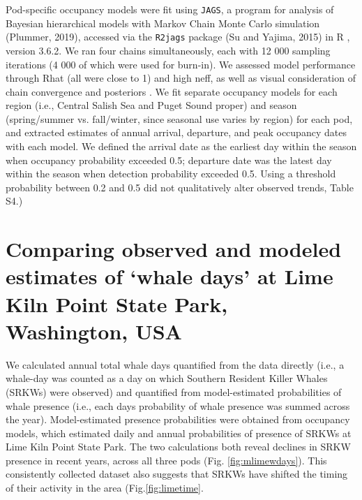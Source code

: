 \documentclass{article}
\begin{document}
\begin{enumerate}
\par Pod-specific occupancy models were fit using \texttt{JAGS}, a program for analysis of Bayesian hierarchical models with Markov Chain Monte Carlo simulation (Plummer, 2019), accessed via the \texttt{R2jags} package (Su and Yajima, 2015) in R \citep{Rcore2019}, version 3.6.2. We ran four chains simultaneously, each with 12 000 sampling iterations (4 000 of which were used for burn-in). We assessed model performance through Rhat (all were close to 1) and high neff, as well as visual consideration of chain convergence and posteriors \citep{BDA}. We fit separate occupancy models for each region (i.e., Central Salish Sea and Puget Sound proper) and season (spring/summer vs. fall/winter, since seasonal use varies by region) for each pod, and extracted estimates of annual arrival, departure, and peak occupancy dates with each model. We defined the arrival date as the earliest day within the season when occupancy probability exceeded 0.5; departure date was the latest day within the season when detection probability exceeded 0.5. Using a threshold probability between 0.2 and 0.5 did not qualitatively alter observed trends, Table S4.)
 
\end{enumerate}

\section* {Comparing observed and modeled estimates of `whale days' at Lime Kiln Point State Park, Washington, USA}
\par We calculated annual total whale days quantified from the data directly (i.e., a whale-day was counted as a day on which Southern Resident Killer Whales (SRKWs) were observed) and quantified from model-estimated probabilities of whale presence (i.e., each days probability of whale presence was summed across the year). Model-estimated presence probabilities were obtained from occupancy models, which estimated daily and annual probabilities of presence of SRKWs at Lime Kiln Point State Park. The two calculations both reveal declines in SRKW presence in recent years, across all three pods (Fig. \ref{fig:mlimewdays}). This consistently collected dataset also suggests that SRKWs have shifted the timing of their activity in the area (Fig.\ref{fig:limetime}.
\end{document}
